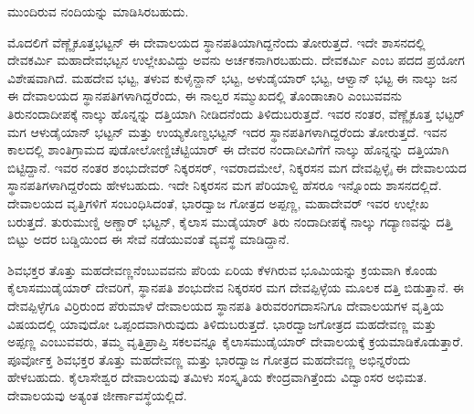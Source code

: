 ಮುಂದಿರುವ ನಂದಿಯನ್ನು ಮಾಡಿಸಿರಬಹುದು.

ಮೊದಲಿಗೆ ವೆಣ್ಣೈಕೂತ್ತಭಟ್ಟನ್​ ಈ ದೇವಾಲಯದ ಸ್ಥಾನಪತಿಯಾಗಿದ್ದನೆಂದು ತೋರುತ್ತದೆ. ಇದೇ ಶಾಸನದಲ್ಲಿ ದೇವಕರ್ಮಿ ಮಹಾದೇವಭಟ್ಟನ ಉಲ್ಲೇಖವಿದ್ದು ಅವನು ಅರ್ಚಕನಾಗಿರಬಹುದು. ದೇವಕರ್ಮಿ ಎಂಬ ಪದದ ಪ್ರಯೋಗ ವಿಶೇಷವಾಗಿದೆ. ಮಹದೇವ ಭಟ್ಟ, ತಳುವ ಕುಳೈನ್ದಾನ್​ ಭಟ್ಟ, ಅಳುಡೈಯಾರ್​ ಭಟ್ಟ, ಆಳ್ವಾನ್​ ಭಟ್ಟ ಈ ನಾಲ್ಕು ಜನ ಈ ದೇವಾಲಯದ ಸ್ಥಾನಪತಿಗಳಾಗಿದ್ದರೆಂದು, ಈ ನಾಲ್ವರ ಸಮ್ಮುಖದಲ್ಲಿ ತೊಂಡಾಚಾರಿ ಎಂಬುವವನು ತಿರುನಂದಾದೀಪಕ್ಕೆ ನಾಲ್ಕು ಹೊನ್ನನ್ನು ದತ್ತಿಯಾಗಿ ನೀಡಿದನೆಂದು ತಿಳಿದುಬರುತ್ತದೆ. ಇವರ ನಂತರ, ವೆಣ್ಣೈಕೂತ್ತ ಭಟ್ಟರ್​ ಮಗ ಆಳುಡೈಯಾನ್​ ಭಟ್ಟನ್​ ಮತ್ತು ಉಯ್ಯಕೊಣ್ಡಭಟ್ಟನ್​ ಇದರ ಸ್ಥಾನಪತಿಗಳಾಗಿದ್ದರೆಂದು ತೋರುತ್ತದೆ. ಇವನ ಕಾಲದಲ್ಲಿ ಶಾಂತಿಗ್ರಾಮದ ಪುಡೋಲೋಣ್ಡಿಚೆಟ್ಟಿಯಾರ್​ ಈ ದೇವರ ನಂದಾದೀವಿಗೆಗೆ ನಾಲ್ಕು ಹೊನ್ನನ್ನು ದತ್ತಿಯಾಗಿ ಬಿಟ್ಟಿದ್ದಾನೆ. ಇವರ ನಂತರ ಶಂಭುದೇವರ್​ ನಿಕ್ಕರಸರ್​, ಇವರಾದಮೇಲೆ, ನಿಕ್ಕರಸನ ಮಗ ದೇವಪ್ಪಿಳ್ಳೈ ಈ ದೇವಾಲಯದ ಸ್ಥಾನಪತಿಗಳಾಗಿದ್ದರೆಂದು ಹೇಳಬಹುದು. ಇದೇ ನಿಕ್ಕರಸನ ಮಗ ಪೆರಿಯಾಳ್ವಿ ಹೆಸರೂ ಇನ್ನೊಂದು ಶಾಸನದಲ್ಲಿದೆ. ದೇವಾಲಯದ ವೃತ್ತಿಗಳಿಗೆ ಸಂಬಂಧಿಸಿದಂತೆ, ಭಾರದ್ವಾಜ ಗೋತ್ರದ ಅಪ್ಪಣ್ಣ, ಮಹಾದೇವರ್​ ಇವರ ಉಲ್ಲೇಖ ಬರುತ್ತದೆ. ತುರುಮುಣ್ಡಿ ಅಣ್ಡಾರ್​ ಭಟ್ಟನ್​, ಕೈಲಾಸ ಮುಡೈಯಾರ್​ ತಿರು ನಂದಾದೀಪಕ್ಕೆ ನಾಲ್ಕು ಗದ್ಯಾಣವನ್ನು ದತ್ತಿ ಬಿಟ್ಟು ಅದರ ಬಡ್ಡಿಯಿಂದ ಈ ಸೇವೆ ನಡೆಯುವಂತೆ ವ್ಯವಸ್ಥೆ ಮಾಡಿದ್ದಾನೆ.

ಶಿವಭಕ್ತರ ತೊತ್ತು ಮಹದೇವಣ್ಣನೆಂಬುವವನು ಪೆರಿಯ ಏರಿಯ ಕೆಳಗಿರುವ ಭೂಮಿಯನ್ನು ಕ್ರಯವಾಗಿ ಕೊಂಡು ಕೈಲಾಸಮುಡೈಯಾರ್​ ದೇವರಿಗೆ, ಸ್ಥಾನಪತಿ ಶಂಭುದೇವ ನಿಕ್ಕರಸರ ಮಗ ದೇವಪ್ಪಿಳ್ಳೆಯ ಮೂಲಕ ದತ್ತಿ ಬಿಡುತ್ತಾನೆ. ಈ ದೇವಪ್ಪಿಳ್ಳೆಗೂ ವಿರ್ರಿರುಂದ ಪೆರುಮಾಳೆ ದೇವಾಲಯದ ಸ್ಥಾನಪತಿ ತಿರುವರಂಗದಾಸನಿಗೂ ದೇವಾಲಯಗಳ ವೃತ್ತಿಯ ವಿಷಯದಲ್ಲಿ ಯಾವುದೋ ಒಪ್ಪಂದವಾಗಿರುವುದು ತಿಳಿದುಬರುತ್ತದೆ. ಭಾರದ್ವಾಜಗೋತ್ರದ ಮಹದೇವಣ್ಣ ಮತ್ತು ಅಪ್ಪಣ್ಣ ಎಂಬುವವರು, ತಮ್ಮ ವೃತ್ತಿಪ್ರಾಪ್ತಿ ಸಕಲವನ್ನೂ ಕೈಲಾಸಮುಡೈಯಾರ್​ ದೇವಾಲಯಕ್ಕೆ ಕ್ರಯಮಾಡಿಕೊಡುತ್ತಾರೆ. ಪೂರ್ವೋಕ್ತ ಶಿವಭಕ್ತರ ತೊತ್ತು ಮಹದೇವಣ್ಣ ಮತ್ತು ಭಾರದ್ವಾಜ ಗೋತ್ರದ ಮಹದೇವಣ್ಣ ಅಭಿನ್ನರೆಂದು ಹೇಳಬಹುದು. ಕೈಲಾಸೇಶ್ವರ ದೇವಾಲಯವು ತಮಿಳು ಸಂಸ್ಕೃತಿಯ ಕೇಂದ್ರವಾಗಿತ್ತೆಂದು ವಿದ್ವಾಂಸರ ಅಭಿಮತ. ದೇವಾಲಯವು ಅತ್ಯಂತ ಜೀರ್ಣಾವಸ್ಥೆಯಲ್ಲಿದೆ.

